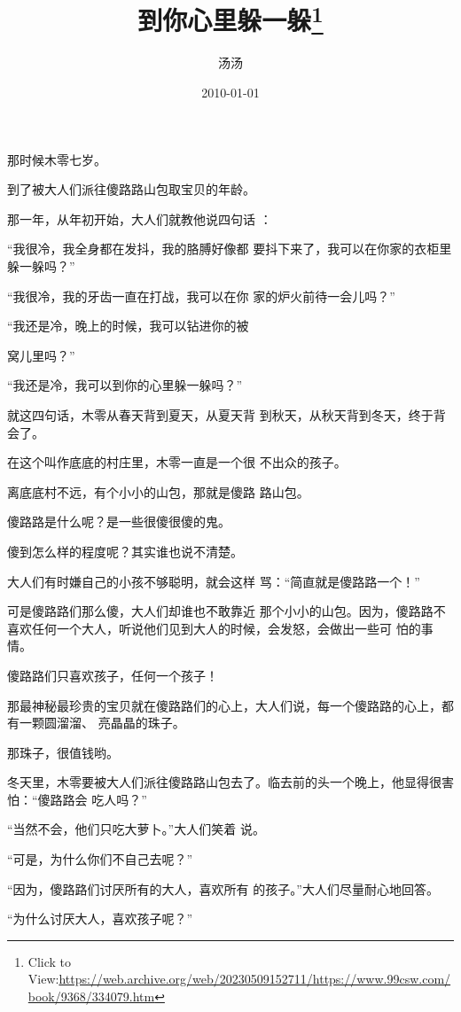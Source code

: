 \documentclass{article}
\title{到你心里躲一躲\footnote{Click to View:\url{https://web.archive.org/web/20230509152711/https://www.99csw.com/book/9368/334079.htm}}}
\author{汤汤}
\date{2010-01-01}
\begin{document}

\maketitle


\Large


﻿那时候木零七岁。 

到了被大人们派往傻路路山包取宝贝的年龄。
 

那一年，从年初开始，大人们就教他说四句话
： 

“我很冷，我全身都在发抖，我的胳膊好像都
要抖下来了，我可以在你家的衣柜里躲一躲吗？” 

“我很冷，我的牙齿一直在打战，我可以在你
家的炉火前待一会儿吗？” 

“我还是冷，晚上的时候，我可以钻进你的被
\newpage

窝儿里吗？” 

“我还是冷，我可以到你的心里躲一躲吗？”

就这四句话，木零从春天背到夏天，从夏天背
到秋天，从秋天背到冬天，终于背会了。 

在这个叫作底底的村庄里，木零一直是一个很
不出众的孩子。 

离底底村不远，有个小小的山包，那就是傻路
路山包。 


傻路路是什么呢？是一些很傻很傻的鬼。 


傻到怎么样的程度呢？其实谁也说不清楚。 

大人们有时嫌自己的小孩不够聪明，就会这样
骂：“简直就是傻路路一个！” 

可是傻路路们那么傻，大人们却谁也不敢靠近
\newpage
那个小小的山包。因为，傻路路不喜欢任何一个大人，听说他们见到大人的时候，会发怒，会做出一些可
怕的事情。 


傻路路们只喜欢孩子，任何一个孩子！ 

那最神秘最珍贵的宝贝就在傻路路们的心上，大人们说，每一个傻路路的心上，都有一颗圆溜溜、
亮晶晶的珠子。 


那珠子，很值钱哟。 

冬天里，木零要被大人们派往傻路路山包去了。临去前的头一个晚上，他显得很害怕：“傻路路会
吃人吗？” 

“当然不会，他们只吃大萝卜。”大人们笑着
说。 


“可是，为什么你们不自己去呢？” 

\newpage

“因为，傻路路们讨厌所有的大人，喜欢所有
的孩子。”大人们尽量耐心地回答。 


“为什么讨厌大人，喜欢孩子呢？” 
\end{document}
